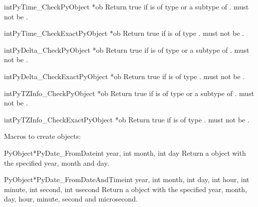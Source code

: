 \begin{cfuncdesc}{int}{PyTime_Check}{PyObject *ob}
  Return true if  is of type  or
  a subtype of .   must not be
  \NULL{}.
\end{cfuncdesc}

\begin{cfuncdesc}{int}{PyTime_CheckExact}{PyObject *ob}
  Return true if  is of type .
   must not be \NULL{}.
\end{cfuncdesc}

\begin{cfuncdesc}{int}{PyDelta_Check}{PyObject *ob}
  Return true if  is of type  or
  a subtype of .   must not be
  \NULL{}.
\end{cfuncdesc}

\begin{cfuncdesc}{int}{PyDelta_CheckExact}{PyObject *ob}
  Return true if  is of type .
   must not be \NULL{}.
\end{cfuncdesc}

\begin{cfuncdesc}{int}{PyTZInfo_Check}{PyObject *ob}
  Return true if  is of type  or
  a subtype of .   must not be
  \NULL{}.
\end{cfuncdesc}

\begin{cfuncdesc}{int}{PyTZInfo_CheckExact}{PyObject *ob}
  Return true if  is of type .
   must not be \NULL{}.
\end{cfuncdesc}

Macros to create objects:

\begin{cfuncdesc}{PyObject*}{PyDate_FromDate}{int year, int month, int day}
  Return a  object with the specified year, month
  and day.
\end{cfuncdesc}

\begin{cfuncdesc}{PyObject*}{PyDate_FromDateAndTime}{int year, int month,
        int day, int hour, int minute, int second, int usecond}
  Return a  object with the specified year, month,
  day, hour, minute, second and microsecond.
\end{cfuncdesc}


